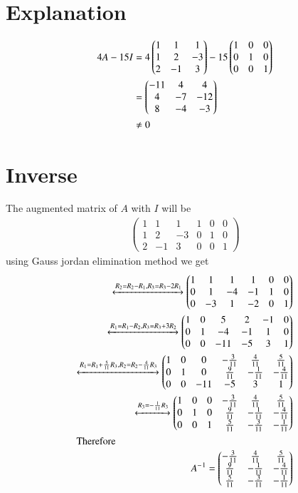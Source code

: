 \documentclass[journal,12pt,twocolumn]{IEEEtran}
\newcommand{\myvec}[1]{\ensuremath{\begin{pmatrix}#1\end{pmatrix}}}
\numberwithin{equation}{subsection}
\begin{document}
\section{Explanation}
\begin{align}
    4A-15I&=4\myvec{1&1&1 \\ 1&2&-3 \\ 2&-1&3}-15\myvec{1&0&0 \\ 0&1&0 \\ 0&0&1}\notag\\
    &=\myvec{-11&4&4\\4&-7&-12\\8&-4&-3}\notag\\
    &\neq0
\end{align}
\section{Inverse}
The augmented matrix of $A$ with $I$ will be
\begin{align}
    \myvec{1 & 1 & 1 & 1 & 0 & 0\\
       1 & 2 & -3 & 0 & 1 &0\\
       2 & -1 & 3 & 0 & 0 &1}
\end{align}
using Gauss jordan elimination method we get
\begin{align}
    \xleftrightarrow{R_2=R_2-R_1,R_3=R_3-2R_1}\myvec{1 & 1 & 1 & 1 & 0 & 0\\
       0 & 1 & -4 & -1 & 1 &0\\
       0 & -3 & 1 & -2 & 0 &1}\\
    \xleftrightarrow{R_1=R_1-R_2,R_3=R_3+3R_2}\myvec{1 & 0 & 5 & 2 & -1 & 0\\
       0 & 1 & -4 & -1 & 1 &0\\
       0 & 0 & -11 & -5 & 3 &1}\\
    \xleftrightarrow{R_1=R_1+\frac{5}{11}R_3,R_2=R_2-\frac{4}{11}R_3}\myvec{1 & 0 & 0 & -\frac{3}{11} & \frac{4}{11} & \frac{5}{11}\\
       0 & 1 & 0 & \frac{9}{11} & -\frac{1}{11} & -\frac{4}{11}\\
       0 & 0 & -11 & -5 & 3 &1}\\
     \xleftrightarrow{R_3=-\frac{1}{11}R_3}\myvec{1 & 0 & 0 & -\frac{3}{11} & \frac{4}{11} & \frac{5}{11}\\
       0 & 1 & 0 & \frac{9}{11} & -\frac{1}{11} & -\frac{4}{11}\\
       0 & 0 & 1 & \frac{5}{11} & -\frac{3}{11} & -\frac{1}{11}}\\
      \intertext{Therefore}
       A^-{^1}=\myvec{-\frac{3}{11} & \frac{4}{11} & \frac{5}{11}\\
       \frac{9}{11} & -\frac{1}{11} & -\frac{4}{11}\\
       \frac{5}{11} & -\frac{3}{11} & -\frac{1}{11}}
\end{align}
\end{document}

